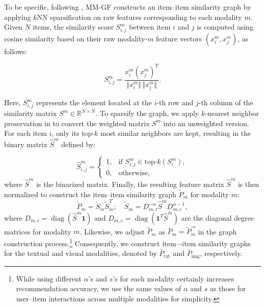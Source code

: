 \documentclass[a4paper,fleqn]{cas-sc}
\renewcommand{\cite}{\citep}
\begin{document}
To be specific, following \cite{DBLP:conf/mm/Zhang00WWW21, DBLP:conf/mm/ZhouS23, DBLP:conf/mm/Yu0LB23}, \textsf{MM-GF} constructs an item--item similarity graph by applying $k$NN sparsification on raw features corresponding to each modality $m$. Given $N$ items, the similarity score $S_{i,j}^m$ between item $i$ and $j$ is computed using cosine similarity based on their raw modality-$m$ feature vectors $(x_i^m, x_j^m)$, as follows:

\begin{equation}
\label{cosine_similarity}
S_{i,j}^m=\frac{x_i^m  (x_j^m)^T}{\Vert x_i^m\Vert\, \Vert x_j^m\Vert}.
\end{equation}

Here, $S_{i,j}^m$ represents the element located at the $i$-th row and $j$-th column of the similarity matrix $S^m \in \mathbb R^{N\times N}$.
To sparsify the graph, we apply $k$-nearest neighbor preservation in \cite{DBLP:conf/mm/ZhouS23} to convert the weighted matrix $S^m$ into an unweighted version. For each item $i$, only its top-$k$ most similar neighbors are kept, resulting in the binary matrix $\hat S^m$ defined by:

\begin{equation}
\label{binary_similarity}
\hat S_{i,j}^m =
    \begin{cases}
        1, & \text{if } S^m_{i,j} \in \text{top-}k(S^m_i), \\
0, & \text{otherwise},
    \end{cases}
\end{equation}
where $\hat S ^m$ is the binarized matrix. Finally, the resulting feature matrix $\hat S^m$ is then normalized to construct the item--item similarity graph $\tilde{P}_m$ for modality $m$:
\begin{equation}
\tilde{P}_m = \tilde{S}_m \tilde{S}_m^T; \quad \tilde{S}_m = D_{m,\text{r}}^{-\alpha} \hat{S}^m D_{m,\text{c}}^{\alpha-1},
\end{equation}
where $D_{m,\text{r}} = \operatorname{diag}(\hat S^m \mathbf{1})$ and $D_{m,\text{c}} = \operatorname{diag}(\mathbf{1}^T \hat S^m)$ are the diagonal degree matrices for modality $m$. Likewise, we adjust $\tilde{P}_m$ as $\bar{P}_m = \tilde{P}_m^{\circ s}$ in the graph construction process.\footnote{While using different $\alpha$'s and $s$'s for each modality certainly increases recommendation accuracy, we use the same values of $\alpha$ and $s$ as those for user--item interactions across multiple modalities for simplicity.} Consequently, we construct item–-item similarity graphs for the textual and visual modalities, denoted by $\bar{P}_{\text{txt}}$ and $\bar{P}_{\text{img}}$, respectively.
\end{document}
